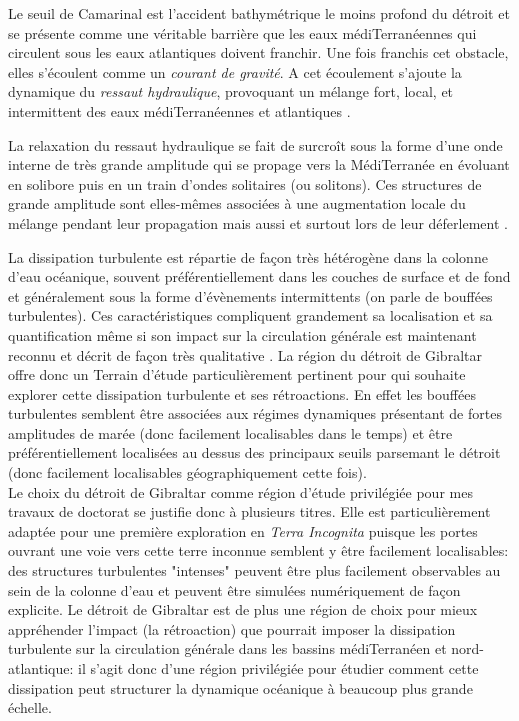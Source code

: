 Le seuil de Camarinal est l'accident bathymétrique le moins profond du détroit et se présente comme une véritable barrière que les eaux médiTerranéennes qui circulent sous les eaux atlantiques doivent franchir. Une fois franchis cet obstacle, elles s'écoulent comme un \textit{courant de gravité}. A cet écoulement s'ajoute la dynamique du \textit{ressaut hydraulique}, provoquant un mélange fort, local, et intermittent des eaux médiTerranéennes et atlantiques \citep{wesson_1994,GarciaLafuente2011}.

La relaxation du ressaut hydraulique se fait de surcroît sous la forme d'une onde interne de très grande amplitude qui se propage vers la MédiTerranée en évoluant \color{green} en solibore puis en un train d'ondes solitaires (ou solitons). Ces structures de grande amplitude sont elles-mêmes associées à une augmentation locale du mélange pendant leur propagation mais aussi et surtout lors de leur déferlement \citep{vlasenko_2009}. \color{red}

\color{blue}
La dissipation turbulente est répartie de façon très hétérogène dans la colonne d'eau océanique, souvent préférentiellement dans les couches de surface et de fond et généralement sous la forme d'évènements intermittents (on parle de bouffées turbulentes). Ces caractéristiques compliquent grandement sa localisation et sa quantification même si son impact sur la circulation générale est maintenant reconnu et décrit de façon très qualitative \cite{de_lavergne_abyssal_2017}. 
La région du détroit de Gibraltar offre donc un Terrain d'étude particulièrement pertinent pour qui souhaite explorer cette dissipation turbulente et ses rétroactions. En effet les bouffées turbulentes semblent être associées aux régimes dynamiques présentant de fortes amplitudes de marée (donc facilement localisables dans le temps) et être préférentiellement localisées au dessus des principaux seuils parsemant le détroit (donc facilement localisables géographiquement cette fois).\\
Le choix du détroit de Gibraltar comme région d'étude privilégiée pour mes travaux de doctorat se justifie donc à plusieurs titres. Elle est particulièrement adaptée pour une première exploration en \textit{Terra Incognita} puisque les portes ouvrant une voie vers cette terre inconnue semblent y être facilement localisables: des structures turbulentes "intenses" peuvent être plus facilement observables au sein de la colonne d'eau et peuvent être simulées numériquement de façon explicite. Le détroit de Gibraltar est de plus une région de choix pour mieux appréhender l'impact (la rétroaction) que pourrait imposer la dissipation turbulente sur la circulation générale dans les bassins médiTerranéen et nord-atlantique: il s'agit donc d'une région privilégiée pour étudier comment cette dissipation peut structurer la dynamique océanique à beaucoup plus grande échelle.
\color{black}

